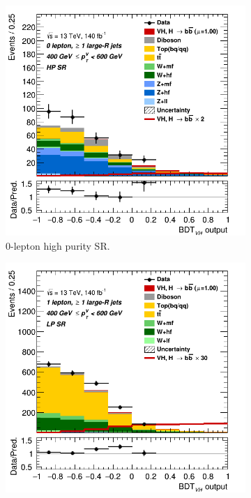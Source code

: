 \begin{figure}[h!]
  \centering
  \begin{subfigure}[b]{0.32\textwidth}
      \centering
      \includegraphics[width=\textwidth]{Images/VH/Own_fit/prefit_VHbb/Region_distmva_BMax600_BMin400_incFat1_Fat1_DSRnoaddbjetsr_J0_TTypebb_T2_L0_Y6051_Prefit.png}
      \caption{0-lepton high purity SR.}
      \label{fig:plots_VHboost_ex_0L_SR}
  \end{subfigure}
  \begin{subfigure}[b]{0.32\textwidth}
      \centering
      \includegraphics[width=\textwidth]{Images/VH/Own_fit/prefit_VHbb/Region_distmva_BMax600_BMin400_incFat1_Fat1_DSRnoaddbjetsr_J1_TTypebb_incJet1_T2_L1_Y6051_Prefit.png}

\end{subfigure}
\end{figure}
